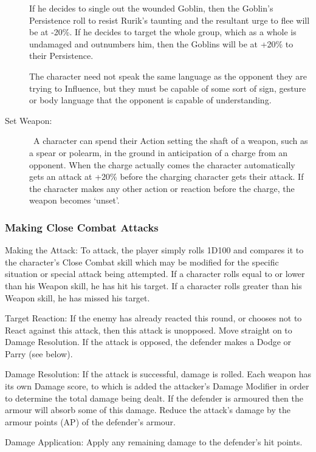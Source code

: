 \begin{description}
\begin{rpg-examplebox}
If he decides to single out the wounded Goblin, then the Goblin’s Persistence roll to resist Rurik’s taunting and the resultant urge to flee will be at -20\%. If he decides to target the whole group, which as a whole is undamaged and outnumbers him, then the Goblins will be at +20\% to their Persistence. 
	\end{rpg-examplebox}

The character need not speak the same language as the opponent they are trying to Influence, but they must be capable of some sort of sign, gesture or body language that the opponent is capable of understanding.

	\item[Set Weapon:]  A character can spend their Action setting the shaft of a weapon, such as a spear or polearm, in the ground in anticipation of a charge from an opponent. When the charge actually comes the character automatically gets an attack at +20\% before the charging character gets their attack. If the character makes any other action or reaction before the charge, the weapon becomes ‘unset’.
\end{description}


\subsubsection{Making Close Combat Attacks}
\begin{rpg-list}
\item Making the Attack: To attack, the player simply rolls 1D100 and compares it to the character’s Close Combat skill which may be modified for the specific situation or special attack being attempted. If a character rolls equal to or lower than his Weapon skill, he has hit his target. If a character rolls greater than his Weapon skill, he has missed his target. 

\item Target Reaction: If the enemy has already reacted this round, or chooses not to React against this attack, then this attack is unopposed. Move straight on to Damage Resolution. If the attack is opposed, the defender makes a Dodge or Parry (see below).

\item Damage Resolution: If the attack is successful, damage is rolled. Each weapon has its own Damage score, to which is added the attacker’s Damage Modifier in order to determine the total damage being dealt. If the defender is armoured then the armour will absorb some of this damage. Reduce the attack’s damage by the armour points (AP) of the defender’s armour. 

\item Damage Application: Apply any remaining damage to the defender’s hit points. 
\end{rpg-list}

